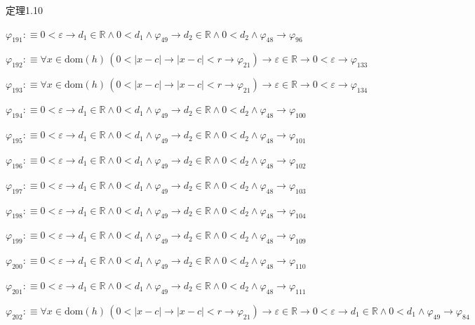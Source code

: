 \begin{fullproof}{定理1.10}
\begin{abbrevlist}
\item $\varphi_{191} :\equiv 0 < \varepsilon \to d_{1} \in \mathbb{R} \land 0 < d_{1} \land \varphi_{49} \to d_{2} \in \mathbb{R} \land 0 < d_{2} \land \varphi_{48} \to \varphi_{96}$
\item $\varphi_{192} :\equiv \forall x \in \mathrm{dom}(h)\,(0 < \lvert x - c \rvert \to \lvert x - c \rvert < r \to \varphi_{21}) \to \varepsilon \in \mathbb{R} \to 0 < \varepsilon \to \varphi_{133}$
\item $\varphi_{193} :\equiv \forall x \in \mathrm{dom}(h)\,(0 < \lvert x - c \rvert \to \lvert x - c \rvert < r \to \varphi_{21}) \to \varepsilon \in \mathbb{R} \to 0 < \varepsilon \to \varphi_{134}$
\item $\varphi_{194} :\equiv 0 < \varepsilon \to d_{1} \in \mathbb{R} \land 0 < d_{1} \land \varphi_{49} \to d_{2} \in \mathbb{R} \land 0 < d_{2} \land \varphi_{48} \to \varphi_{100}$
\item $\varphi_{195} :\equiv 0 < \varepsilon \to d_{1} \in \mathbb{R} \land 0 < d_{1} \land \varphi_{49} \to d_{2} \in \mathbb{R} \land 0 < d_{2} \land \varphi_{48} \to \varphi_{101}$
\item $\varphi_{196} :\equiv 0 < \varepsilon \to d_{1} \in \mathbb{R} \land 0 < d_{1} \land \varphi_{49} \to d_{2} \in \mathbb{R} \land 0 < d_{2} \land \varphi_{48} \to \varphi_{102}$
\item $\varphi_{197} :\equiv 0 < \varepsilon \to d_{1} \in \mathbb{R} \land 0 < d_{1} \land \varphi_{49} \to d_{2} \in \mathbb{R} \land 0 < d_{2} \land \varphi_{48} \to \varphi_{103}$
\item $\varphi_{198} :\equiv 0 < \varepsilon \to d_{1} \in \mathbb{R} \land 0 < d_{1} \land \varphi_{49} \to d_{2} \in \mathbb{R} \land 0 < d_{2} \land \varphi_{48} \to \varphi_{104}$
\item $\varphi_{199} :\equiv 0 < \varepsilon \to d_{1} \in \mathbb{R} \land 0 < d_{1} \land \varphi_{49} \to d_{2} \in \mathbb{R} \land 0 < d_{2} \land \varphi_{48} \to \varphi_{109}$
\item $\varphi_{200} :\equiv 0 < \varepsilon \to d_{1} \in \mathbb{R} \land 0 < d_{1} \land \varphi_{49} \to d_{2} \in \mathbb{R} \land 0 < d_{2} \land \varphi_{48} \to \varphi_{110}$
\item $\varphi_{201} :\equiv 0 < \varepsilon \to d_{1} \in \mathbb{R} \land 0 < d_{1} \land \varphi_{49} \to d_{2} \in \mathbb{R} \land 0 < d_{2} \land \varphi_{48} \to \varphi_{111}$
\item $\varphi_{202} :\equiv \forall x \in \mathrm{dom}(h)\,(0 < \lvert x - c \rvert \to \lvert x - c \rvert < r \to \varphi_{21}) \to \varepsilon \in \mathbb{R} \to 0 < \varepsilon \to d_{1} \in \mathbb{R} \land 0 < d_{1} \land \varphi_{49} \to \varphi_{84}$

\end{abbrevlist}
\end{fullproof}
